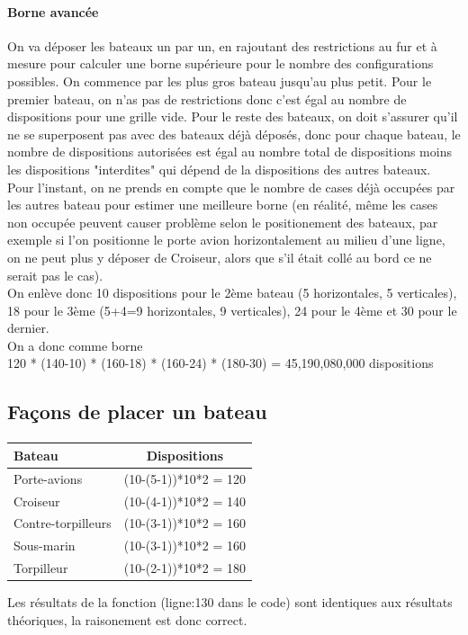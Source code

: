 \documentclass[12pt]{article}
\begin{document}
        \paragraph{Borne avancée}
            On va déposer les bateaux un par un, en rajoutant des restrictions au fur et à mesure pour calculer une borne supérieure pour le nombre des configurations possibles. On commence par les plus gros bateau jusqu'au plus petit.
            Pour le premier bateau, on n'as pas de restrictions donc c'est égal au nombre de dispositions pour une grille vide.
            Pour le reste des bateaux, on doit s'assurer qu'il ne se superposent pas avec des bateaux déjà déposés, donc pour chaque bateau, le nombre de dispositions autorisées est égal au nombre total de dispositions moins les dispositions "interdites" qui dépend de la dispositions des autres bateaux.\\
            Pour l'instant, on ne prends en compte que le nombre de cases déjà occupées par les autres bateau pour estimer une meilleure borne (en réalité, même les cases non occupée peuvent causer problème selon le positionement des bateaux, par exemple si l'on positionne le porte avion horizontalement au milieu d'une ligne, on ne peut plus y déposer de Croiseur, alors que s'il était collé au bord ce ne serait pas le cas).\\
            On enlève donc 10 dispositions pour le 2ème bateau (5 horizontales, 5 verticales), 18 pour le 3ème (5+4=9 horizontales, 9 verticales), 24 pour le 4ème et 30 pour le dernier. \\
            On a donc comme borne \\120 * (140-10) * (160-18) * (160-24) * (180-30) = 45,190,080,000 dispositions
            \clearpage
        
        \subsection{Façons de placer un bateau}
            \paragraph{}
            \begin{table}[!ht]
                \begin{tabular}{|l|c|}
                \hline
                Bateau               & Dispositions \\ \hline
                Porte-avions         & (10-(5-1))*10*2 = 120 \\ \hline
                Croiseur             & (10-(4-1))*10*2 = 140 \\ \hline
                Contre-torpilleurs   & (10-(3-1))*10*2 = 160 \\ \hline
                Sous-marin           & (10-(3-1))*10*2 = 160 \\ \hline
                Torpilleur           & (10-(2-1))*10*2 = 180 \\ \hline
                \end{tabular}
                \end{table}
                Les résultats de la fonction (ligne:130 dans le code) sont identiques aux résultats théoriques, la raisonement est donc correct.        
\end{document}
